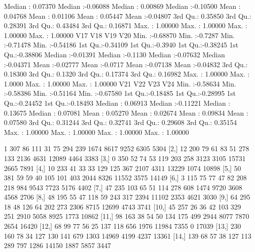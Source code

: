 \documentclass[a4paper, 12pt]{article}
\begin{document}
\begin{table}[H]
\begin{Schunk}
\begin{Soutput}
 Median : 0.07370   Median :-0.06088   Median : 0.00869   Median :-0.10500  
 Mean   : 0.04768   Mean   : 0.01106   Mean   : 0.05447   Mean   :-0.04807  
 3rd Qu.: 0.35850   3rd Qu.: 0.28391   3rd Qu.: 0.43484   3rd Qu.: 0.16871  
 Max.   : 1.00000   Max.   : 1.00000   Max.   : 1.00000   Max.   : 1.00000  
      V17                V18               V19                V20          
 Min.   :-0.68870   Min.   :-0.7287   Min.   :-0.71478   Min.   :-0.54186  
 1st Qu.:-0.34109   1st Qu.:-0.3940   1st Qu.:-0.38245   1st Qu.:-0.38806  
 Median :-0.01391   Median :-0.1130   Median :-0.07632   Median :-0.04371  
 Mean   :-0.02777   Mean   :-0.0717   Mean   :-0.07138   Mean   :-0.04832  
 3rd Qu.: 0.18300   3rd Qu.: 0.1320   3rd Qu.: 0.17374   3rd Qu.: 0.16982  
 Max.   : 1.00000   Max.   : 1.0000   Max.   : 1.00000   Max.   : 1.00000  
      V21                V22                V23                V24          
 Min.   :-0.58634   Min.   :-0.58386   Min.   :-0.51164   Min.   :-0.67580  
 1st Qu.:-0.18485   1st Qu.:-0.28995   1st Qu.:-0.24452   1st Qu.:-0.18493  
 Median : 0.06913   Median :-0.11221   Median : 0.13675   Median : 0.07081  
 Mean   : 0.05270   Mean   : 0.02674   Mean   : 0.09834   Mean   : 0.07580  
 3rd Qu.: 0.31244   3rd Qu.: 0.32741   3rd Qu.: 0.29608   3rd Qu.: 0.35154  
 Max.   : 1.00000   Max.   : 1.00000   Max.   : 1.00000   Max.   : 1.00000  
\end{Soutput}
\begin{Soutput}
      [,1] [,2] [,3] [,4] [,5] [,6] [,7] [,8] [,9] [,10] [,11] [,12] [,13]
 [1,]    1  307   86  111   31   75  294  239 1674  8617  9252  6305  5304
 [2,]   12  200   79   61   83   51  278  133 2136  4631 12089  4464  3383
 [3,]    0  350   52   74   53  119  203  258 3123  3105 15731  2665  7891
 [4,]   10  233   41   33   33  129  125  367 2107  4311 13229  1074 10898
 [5,]   50  381   59   59   40  105  101  403 2044  8326 11552  3575 14149
 [6,]    3  115   75   77   47   82  208  218  984  9543  7723  5176  4402
 [7,]   47  235  103   65   51  114  278  608 1474  9720  3608  4568  2706
 [8,]   48  195   55   47  118   59  243  317 2394 11102  2353  4621  3030
 [9,]   64  295   18   48  126   64  202  273 2306  8715 12699  4743  3741
[10,]   45  257   26   36   42  103  329  251 2910  5058  8925  1773 10862
[11,]   98  163   38   54   50  134  175  499 2944  8077  7870  2654 16420
[12,]   68   99   77   56   25  137  118  656 1976 11984  7355     0 17039
[13,]  230  160   78   34  127  130  141  679 1303 14969  4199  4237 13361
[14,]  139   68   57   38  127  113  289  797 1286 14150  1887  5857  3447

\end{Soutput}
\end{Schunk}
\end{table}
\end{document}
